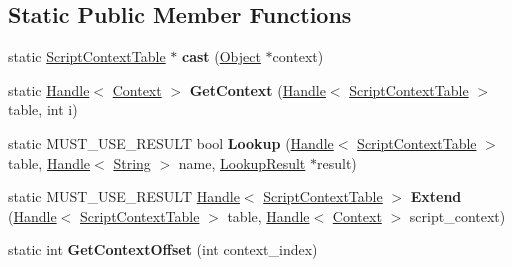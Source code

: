 \subsection*{Static Public Member Functions}
\begin{DoxyCompactItemize}
\item 
static \hyperlink{classv8_1_1internal_1_1_script_context_table}{Script\+Context\+Table} $\ast$ {\bfseries cast} (\hyperlink{classv8_1_1internal_1_1_object}{Object} $\ast$context)\hypertarget{classv8_1_1internal_1_1_script_context_table_a7da3959b59f5a128147543c1548c69f7}{}\label{classv8_1_1internal_1_1_script_context_table_a7da3959b59f5a128147543c1548c69f7}

\item 
static \hyperlink{classv8_1_1internal_1_1_handle}{Handle}$<$ \hyperlink{classv8_1_1internal_1_1_context}{Context} $>$ {\bfseries Get\+Context} (\hyperlink{classv8_1_1internal_1_1_handle}{Handle}$<$ \hyperlink{classv8_1_1internal_1_1_script_context_table}{Script\+Context\+Table} $>$ table, int i)\hypertarget{classv8_1_1internal_1_1_script_context_table_aa4e9d60e80a3af709856562c3ea68ab0}{}\label{classv8_1_1internal_1_1_script_context_table_aa4e9d60e80a3af709856562c3ea68ab0}

\item 
static M\+U\+S\+T\+\_\+\+U\+S\+E\+\_\+\+R\+E\+S\+U\+LT bool {\bfseries Lookup} (\hyperlink{classv8_1_1internal_1_1_handle}{Handle}$<$ \hyperlink{classv8_1_1internal_1_1_script_context_table}{Script\+Context\+Table} $>$ table, \hyperlink{classv8_1_1internal_1_1_handle}{Handle}$<$ \hyperlink{classv8_1_1internal_1_1_string}{String} $>$ name, \hyperlink{structv8_1_1internal_1_1_script_context_table_1_1_lookup_result}{Lookup\+Result} $\ast$result)\hypertarget{classv8_1_1internal_1_1_script_context_table_a60ccd607db3cf08ecf085859166f5e45}{}\label{classv8_1_1internal_1_1_script_context_table_a60ccd607db3cf08ecf085859166f5e45}

\item 
static M\+U\+S\+T\+\_\+\+U\+S\+E\+\_\+\+R\+E\+S\+U\+LT \hyperlink{classv8_1_1internal_1_1_handle}{Handle}$<$ \hyperlink{classv8_1_1internal_1_1_script_context_table}{Script\+Context\+Table} $>$ {\bfseries Extend} (\hyperlink{classv8_1_1internal_1_1_handle}{Handle}$<$ \hyperlink{classv8_1_1internal_1_1_script_context_table}{Script\+Context\+Table} $>$ table, \hyperlink{classv8_1_1internal_1_1_handle}{Handle}$<$ \hyperlink{classv8_1_1internal_1_1_context}{Context} $>$ script\+\_\+context)\hypertarget{classv8_1_1internal_1_1_script_context_table_a209aaa92e2a6ca9be52942c66ac6afab}{}\label{classv8_1_1internal_1_1_script_context_table_a209aaa92e2a6ca9be52942c66ac6afab}

\item 
static int {\bfseries Get\+Context\+Offset} (int context\+\_\+index)\hypertarget{classv8_1_1internal_1_1_script_context_table_a79367e481f2ca0c0aec2c4971ebe48ab}{}\label{classv8_1_1internal_1_1_script_context_table_a79367e481f2ca0c0aec2c4971ebe48ab}

\end{DoxyCompactItemize}
